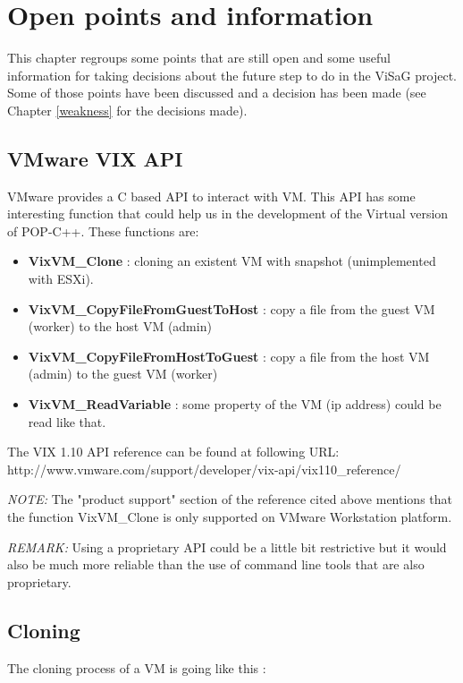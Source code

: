 \section{Open points and information}
\label{sec:open_points}
\label{hints}

This chapter regroups some points that are still open and some useful information for taking decisions about the future step to do in the ViSaG project. Some of those points have been discussed and a decision has been made (see Chapter \ref{weakness} for the decisions made). 

\subsection{VMware VIX API}
VMware provides a C based API to interact with VM. This API has some interesting function that could help us in the development of the Virtual version of POP-C++. These functions are: 

\begin{itemize}
\item \textbf{VixVM\_Clone} : cloning an existent VM with snapshot (unimplemented with ESXi).
\item \textbf{VixVM\_CopyFileFromGuestToHost} : copy a file from the guest VM (worker) to the host VM (admin)
\item \textbf{VixVM\_CopyFileFromHostToGuest} : copy a file from the host VM (admin) to the guest VM (worker)
\item \textbf{VixVM\_ReadVariable} : some property of the VM (ip address) could be read like that.
\end{itemize}

The VIX 1.10 API reference can be found at following URL: \\
http://www.vmware.com/support/developer/vix-api/vix110\_reference/\s

\textit{NOTE:} The "product support" section of the reference cited above mentions that the function VixVM\_Clone is only supported on VMware Workstation platform.\s

\textit{REMARK:} Using a proprietary API could be a little bit restrictive but it would also be much more reliable than the use of command line tools that are also proprietary.

\subsection{Cloning}
The cloning process of a VM is going like this : 

